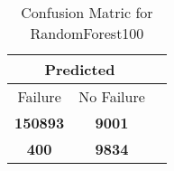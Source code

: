 \begin{table}[] 
\caption{Confusion Matric for RandomForest100} 
\label{Table: Prediction Accuracy-NoneRandomForest100DecisionTrees100EKF-ignoreReflection-Reflection} 
\centering 
\begin{tabular} 
 {@{}ccc@{}} 
\toprule 
\multicolumn{2}{c}{\textbf{Predicted}}
 \\ \midrule 
\multicolumn{1}{|c|}{Failure} & 
\multicolumn{1}{c|}{No Failure}
 \\ \midrule 
\multicolumn{1}{|c|}{\color{green}\textbf{150893}} & 
\multicolumn{1}{c|}{\color{red}\textbf{9001}}
 \\ \midrule 
\multicolumn{1}{|c|}{\color{red}\textbf{400}} & 
\multicolumn{1}{c|}{\color{green}\textbf{9834}}
 \\ \bottomrule 
\end{tabular} 
\end{table} 

